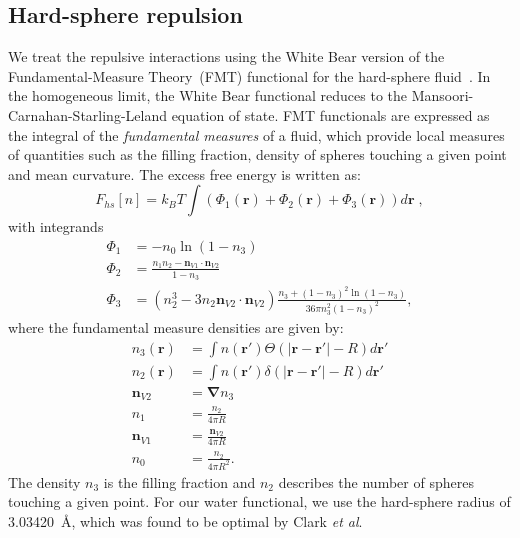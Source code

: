 \documentclass[letterpaper,twocolumn,amsmath,amssymb,prb]{revtex4-1}
\newcommand{\xx}{\textbf{r}}
\begin{document}
\subsection{Hard-sphere repulsion}

We treat the repulsive interactions using the White Bear version of
the Fundamental-Measure Theory~(FMT) functional for the hard-sphere
fluid~\cite{roth2002whitebear}.  In the homogeneous limit, the White
Bear functional reduces to the Mansoori-Carnahan-Starling-Leland
equation of state.  FMT functionals are expressed as the integral of
the \emph{fundamental measures} of a fluid, which provide local
measures of quantities such as the filling fraction, density of
spheres touching a given point and mean curvature.  The excess free
energy is written as:
\begin{equation}
F_{hs}[n] = k_B T \int (\Phi_1(\xx) + \Phi_2(\xx) + \Phi_3(\xx)) d\xx \; ,
\end{equation}
with integrands
\begin{align}
\Phi_1 &= -n_0 \ln\left( 1 - n_3\right)\\
\Phi_2 &= \frac{n_1 n_2 - \mathbf{n}_{V1} \cdot\mathbf{n}_{V2}}{1-n_3} \\
\Phi_3 &= (n_2^3 - 3n_2 \mathbf{n}_{V2} \cdot \mathbf{n}_{V2})
  \frac{
    n_3 + (1-n_3)^2\ln(1-n_3)
  }{
    36\pi n_3^2\left( 1 - n_3 \right)^2
  } ,
\end{align}
where the fundamental measure densities are given by:
\begin{align}
  n_3(\xx) &= \int n(\xx') \Theta(\left|\xx - \xx'\right| - R) d\xx' \\
  n_2(\xx) &= \int n(\xx') \delta(\left|\xx - \xx'\right| - R) d\xx'
  \\
  \mathbf{n}_{V2} &= \mathbf{\nabla} n_3 \\
  n_1 &= \frac{n_2}{4\pi R}\\
  \mathbf{n}_{V1} &= \frac{\mathbf{n}_{V2}}{4\pi R}\\
  n_0 &= \frac{n_2}{4\pi R^2}.
\end{align}
The density $n_3$ is the filling fraction and $n_2$ describes the number
of spheres touching a given point. For our water functional, we use the 
hard-sphere radius of
3.03420~\AA, which was found to be optimal by Clark
\emph{et al}.\cite{clark2006developing}

\newcommand\etadisp{\ensuremath{\eta_\textit{d}}}
\newcommand\epsilondisp{\ensuremath{\epsilon_\textit{d}}}
\newcommand\epsilonassoc{\ensuremath{\epsilon_\textit{a}}}
\newcommand\kappaassoc{\ensuremath{\kappa_\textit{a}}}
\newcommand\lambdadisp{\ensuremath{\lambda_\textit{d}}}
\newcommand\lscale{\ensuremath{s_d}}
\end{document}
